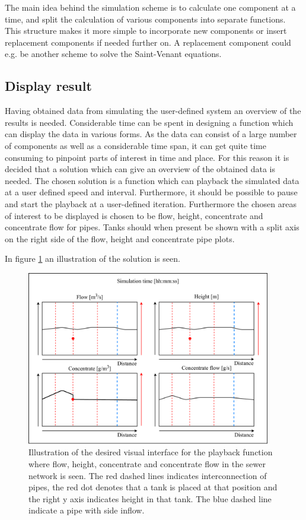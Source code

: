 The main idea behind the simulation scheme is to calculate one component at a time, and split the calculation of various components into separate functions.
This structure makes it more simple to incorporate new components or insert replacement components if needed further on. A replacement component could e.g. be another scheme to solve the Saint-Venant equations.  

\subsection*{Display result}

Having obtained data from simulating the user-defined system an overview of the results is needed. Considerable time can be spent in designing a function which can display the data in various forms. As the data can consist of a large number of components as well as a considerable time span, it can get quite time consuming to pinpoint parts of interest in time and place. For this reason it is decided that a solution which can give an overview of the obtained data is needed. The chosen solution is a function which can playback the simulated data at a user defined speed and interval. Furthermore, it should be possible to pause and start the playback at a user-defined iteration. Furthermore the chosen areas of interest to be displayed is chosen to be flow, height, concentrate and concentrate flow for pipes. Tanks should when present be shown with a split axis on the right side of the flow, height and concentrate pipe plots.

In figure \ref{fig:display_results} an illustration of the solution is seen.   

\begin{figure}[H]
	\centering
	\includegraphics[width=0.95\textwidth]{report/simulation/pictures/display_results}
	\caption{Illustration of the desired visual interface for the playback function where flow, height, concentrate and concentrate flow in the sewer network is seen. The red dashed lines indicates interconnection of pipes, the red dot denotes that a tank is placed at that position and the right y axis indicates height in that tank. The blue dashed line indicate a pipe with side inflow.}
	\label{fig:display_results}
\end{figure}

